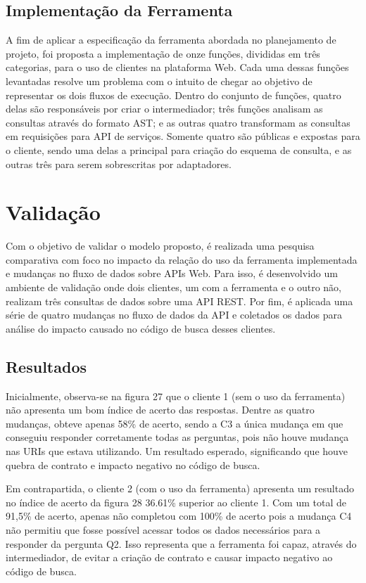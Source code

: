 \documentclass[12pt]{article}
\begin{document}
  \subsection{Implementação da Ferramenta}

  A fim de aplicar a especificação da ferramenta abordada no planejamento de projeto, foi proposta a implementação de onze funções, divididas em três categorias, para o uso de clientes na plataforma Web. Cada uma dessas funções levantadas resolve um problema com o intuito de chegar ao objetivo de representar os dois fluxos de execução. Dentro do conjunto de funções, quatro delas são responsáveis por criar o intermediador; três funções analisam as consultas através do formato AST; e as outras quatro transformam as consultas em requisições para API de serviços. Somente quatro são públicas e expostas para o cliente, sendo uma delas a principal para criação do esquema de consulta, e as outras três para serem sobrescritas por adaptadores.

  \section{Validação}\label{sec:figs}

  Com o objetivo de validar o modelo proposto, é realizada uma pesquisa comparativa com foco no impacto da relação do uso da ferramenta implementada e mudanças no fluxo de dados sobre APIs Web. Para isso, é desenvolvido um ambiente de validação onde dois clientes, um com a ferramenta e o outro não, realizam três consultas de dados sobre uma API REST. Por fim, é aplicada uma série de quatro mudanças no fluxo de dados da API e coletados os dados para análise do impacto causado no código de busca desses clientes.

  \subsection{Resultados}

  Inicialmente, observa-se na figura 27 que o cliente 1 (sem o uso da ferramenta) não apresenta um bom índice de acerto das respostas. Dentre as quatro mudanças, obteve apenas 58\% de acerto, sendo a C3 a única mudança em que conseguiu responder corretamente todas as perguntas, pois não houve mudança nas URIs que estava utilizando. Um resultado esperado, significando que houve quebra de contrato e impacto negativo no código de busca.

  Em contrapartida, o cliente 2 (com o uso da ferramenta) apresenta um resultado no índice de acerto da figura 28 36.61\% superior ao cliente 1. Com um total de 91,5\% de acerto, apenas não completou com 100\% de acerto pois a mudança C4 não permitiu que fosse possível acessar todos os dados necessários para a responder da pergunta Q2. Isso representa que a ferramenta foi capaz, através do intermediador, de evitar a criação de contrato e causar impacto negativo ao código de busca.
\end{document}
